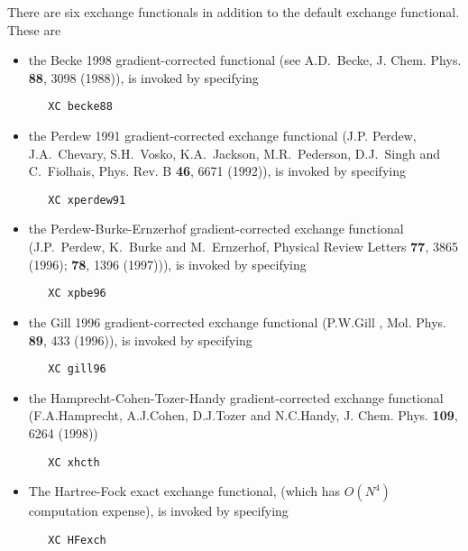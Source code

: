 There are six exchange functionals in addition to the default exchange
functional.  These are 
\begin{itemize}

\item the Becke 1998 gradient-corrected functional (see A.D.~Becke, 
 J. Chem. Phys. {\bf 88}, 3098 (1988)), is invoked by specifying

\begin{verbatim}
   XC becke88
\end{verbatim}

\item the Perdew 1991 gradient-corrected exchange functional (J.P. Perdew,
  J.A.~Chevary, S.H.~Vosko, K.A.~Jackson, M.R.~Pederson, D.J.~Singh
  and C.~Fiolhais, Phys. Rev. B {\bf 46}, 6671 (1992)), is invoked by specifying

\begin{verbatim}
   XC xperdew91
\end{verbatim}

\item the Perdew-Burke-Ernzerhof gradient-corrected exchange functional \\
 (J.P.~Perdew, K.~Burke and M.~Ernzerhof, Physical Review Letters
{\bf 77}, 3865 (1996); {\bf 78}, 1396 (1997))), is invoked by specifying

\begin{verbatim}
   XC xpbe96
\end{verbatim}

\item the Gill 1996 gradient-corrected exchange functional (P.W.Gill , Mol. Phys. {\bf 89}, 433 (1996)), is invoked by specifying

\begin{verbatim}
   XC gill96
\end{verbatim}

\item the Hamprecht-Cohen-Tozer-Handy  gradient-corrected exchange 
functional
(F.A.Hamprecht, A.J.Cohen, D.J.Tozer and N.C.Handy, 
    J. Chem. Phys. {\bf 109}, 6264 (1998))
\begin{verbatim}
   XC xhcth
\end{verbatim}

\item The Hartree-Fock exact exchange functional, (which has $O(N^4)$
computation expense), is invoked by specifying
\begin{verbatim}
   XC HFexch
\end{verbatim}
\end{itemize}

